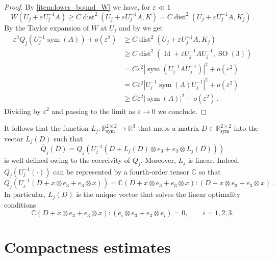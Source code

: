 \documentclass{article}
\theoremstyle{plain}
\theoremstyle{plain}
\theoremstyle{plain}
\theoremstyle{plain}
\theoremstyle{plain}
\theoremstyle{definition}
\theoremstyle{definition}
\renewcommand{\r}{\mathbb{R}}
\DeclareMathOperator{\Id}{Id}
\DeclareMathOperator{\SO}{SO}
\DeclareMathOperator{\sym}{sym}
\DeclareMathOperator{\dist}{dist}
\begin{document}
\begin{proof}
    By \ref{item:lower_bound_W} we have, for $\varepsilon \ll 1$
    \[
        W(U_j + \varepsilon U_j^{-1}A) \geq C \dist^2(U_j + \varepsilon U_j^{-1}A, K) = C \dist^2(U_j + \varepsilon U_j^{-1}A, K_j) \,.
    \]
    By the Taylor expansion of $W$ at $U_j$ and by  we get
    \begin{align}
        \varepsilon^2 Q_j(U_j^{-1} \sym(A)) + o(\varepsilon^2) & \geq C \dist^2(U_j + \varepsilon U_j^{-1}A, K_j) \\
        & \geq C \dist^2(\Id + \varepsilon U_j^{-1}AU_j^{-1}, \SO(3))\\
        & = C \varepsilon^2 |\sym(U_j^{-1}AU_j^{-1})|^2 + o(\varepsilon^2)\\
        & = C \varepsilon^2 |U_j^{-1}\sym(A)U_j^{-1}|^2 + o(\varepsilon^2)\\
        & \geq C \varepsilon^2 |\sym(A)|^2 + o(\varepsilon^2)\,.
    \end{align}
    Dividing by $\varepsilon^2$ and passing to the limit as $\varepsilon \to 0$ we conclude.
\end{proof}

It follows that the function $L_j: \r^{2 \times 2}_{\sym} \to \r^3$ that maps a matrix $D \in \r^{2 \times 2}_{\sym}$ into the vector $L_j(D)$ such that
\begin{equation}\label{eq:definition_L}
    \bar Q_j(D) = Q_j(U_j^{-1}(D + L_j(D) \otimes e_3 + e_3 \otimes L_j(D))) 
\end{equation}
is well-defined owing to the coercivity of $Q_j$.
Moreover, $ L_{j} $ is linear. 
Indeed, $ Q_{j}(U_{j}^{-1}(\cdot)) $ can be represented by a fourth-order tensor $ \mathbb{C} $ so that
\begin{equation}
    Q_{j}(U_{j}^{-1}(D + x \otimes e_{3} + e_{3} \otimes x)) = \mathbb{C}(D + x \otimes e_{3} + e_{3} \otimes x):(D + x \otimes e_{3} + e_{3} \otimes x) \,.
\end{equation}
In particular, $ L_{j}(D) $ is the unique vector that solves the linear optimality conditions
\begin{equation}
    \mathbb{C}(D + x \otimes e_{3} + e_{3} \otimes x):(e_{i} \otimes e_{3} + e_{3} \otimes e_{i}) = 0, \qquad i = 1, 2, 3.
\end{equation}




\section{Compactness estimates}\label{section:compactness}
\end{document}
